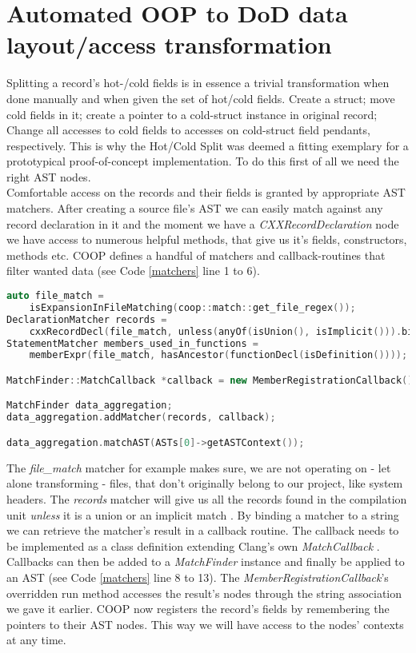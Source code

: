 \section{Automated OOP to DoD data layout/access transformation}\label{auto_oop_to_dod}
Splitting a record's hot-/cold fields is in essence a trivial transformation when done manually and when given the set of hot/cold fields. Create a struct; move cold fields in it; create a pointer to a cold-struct instance in original record; Change all accesses to cold fields to accesses on cold-struct field pendants, respectively. This is why the Hot/Cold Split was deemed a fitting exemplary for a prototypical proof-of-concept implementation. To do this first of all we need the right AST nodes.\\
Comfortable access on the records and their fields is granted by appropriate AST matchers. After creating a source file's AST we can easily match against any record declaration in it and the moment we have a \textit{CXXRecordDeclaration} node we have access to numerous helpful methods, that give us it's fields, constructors, methods etc. COOP defines a handful of matchers and callback-routines that filter wanted data (see Code \ref{matchers} line 1 to 6).
\begin{lstlisting}[language=C++,name={Some matchers used by COOP to filter relevant AST nodes and their utilization },label={matchers}]
auto file_match =
	isExpansionInFileMatching(coop::match::get_file_regex());
DeclarationMatcher records =
	cxxRecordDecl(file_match, unless(anyOf(isUnion(), isImplicit())).bind("record_binding");
StatementMatcher members_used_in_functions =
	memberExpr(file_match, hasAncestor(functionDecl(isDefinition())));

MatchFinder::MatchCallback *callback = new MemberRegistrationCallback();

MatchFinder data_aggregation;
data_aggregation.addMatcher(records, callback);

data_aggregation.matchAST(ASTs[0]->getASTContext());
\end{lstlisting}
The \textit{file\_match} matcher for example makes sure, we are not operating on - let alone transforming - files, that don't originally belong to our project, like system headers. The \textit{records} matcher will give us all the records found in the compilation unit \textit{unless} it is a union or an implicit match . By binding a matcher to a string we can retrieve the matcher's result in a callback routine. The callback needs to be implemented as a class definition extending Clang's own \textit{MatchCallback} . Callbacks can then be added to a \textit{MatchFinder} instance and finally be applied to an AST (see Code \ref{matchers} line 8 to 13). The \textit{MemberRegistrationCallback}'s overridden run method accesses the result's nodes through the string association we gave it earlier. COOP now registers the record's fields by remembering the pointers to their AST nodes. This way we will have access to the nodes' contexts at any time.\\\\
